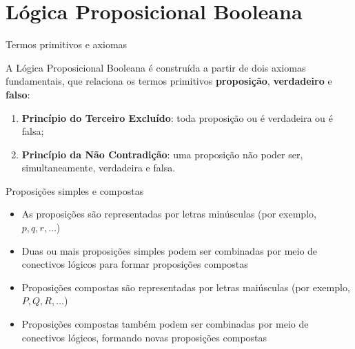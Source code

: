 \section*{Lógica Proposicional Booleana}

\begin{frame}[fragile]{Termos primitivos e axiomas}

A Lógica Proposicional Booleana é construída a partir de dois axiomas fundamentais, que relaciona os termos primitivos \textbf{proposição},
\textbf{verdadeiro} e \textbf{falso}:

\begin{enumerate}
    \item \textbf{Princípio do Terceiro Excluído}: toda proposição ou é verdadeira ou é falsa;
    \item \textbf{Princípio da Não Contradição}: uma proposição não poder ser, simultaneamente, verdadeira e falsa.
\end{enumerate}

\end{frame}

\begin{frame}[fragile]{Proposições simples e compostas}

    \begin{itemize}
        \item As proposições são representadas por letras minúsculas (por exemplo, $p, q, r, \ldots$)

        \item Duas ou mais proposições simples podem ser combinadas por meio de conectivos lógicos para formar proposições compostas 

        \item Proposições compostas são representadas por letras maiúsculas (por exemplo, $P, Q, R, \ldots$)

        \item Proposições compostas também podem ser combinadas por meio de conectivos lógicos, formando novas proposições compostas
    \end{itemize}

\end{frame}

